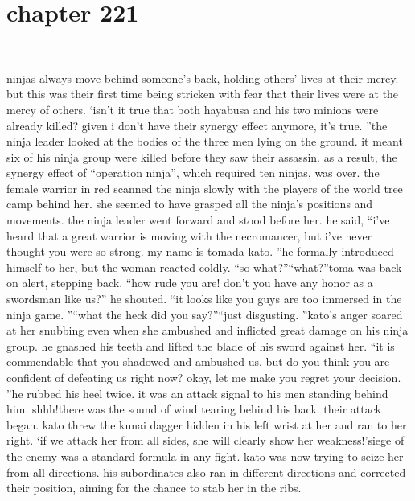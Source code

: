 \section{chapter 221}

                             




ninjas always move behind someone’s back, holding others’ lives at their mercy.
but this was their first time being stricken with fear that their lives were at the mercy of others.
‘isn’t it true that both hayabusa and his two minions were already killed? given i don’t have their synergy effect anymore, it’s true.
”the ninja leader looked at the bodies of the three men lying on the ground.
 it meant six of his ninja group were killed before they saw their assassin.
 as a result, the synergy effect of “operation ninja”, which required ten ninjas, was over.
the female warrior in red scanned the ninja slowly with the players of the world tree camp behind her.
 she seemed to have grasped all the ninja’s positions and movements.
the ninja leader went forward and stood before her.
he said, “i’ve heard that a great warrior is moving with the necromancer, but i’ve never thought you were so strong.
 my name is tomada kato.
”he formally introduced himself to her, but the woman reacted coldly.
“so what?”“what?”toma was back on alert, stepping back.
“how rude you are! don’t you have any honor as a swordsman like us?” he shouted.
“it looks like you guys are too immersed in the ninja game.
”“what the heck did you say?”“just disgusting.
”kato’s anger soared at her snubbing even when she ambushed and inflicted great damage on his ninja group.
 he gnashed his teeth and lifted the blade of his sword against her.
“it is commendable that you shadowed and ambushed us, but do you think you are confident of defeating us right now? okay, let me make you regret your decision.
”he rubbed his heel twice.
 it was an attack signal to his men standing behind him.
shhh!there was the sound of wind tearing behind his back.
 their attack began.
 kato threw the kunai dagger hidden in his left wrist at her and ran to her right.
‘if we attack her from all sides, she will clearly show her weakness!’siege of the enemy was a standard formula in any fight.
 kato was now trying to seize her from all directions.
his subordinates also ran in different directions and corrected their position, aiming for the chance to stab her in the ribs.

